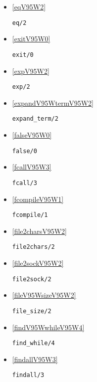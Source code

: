 \begin{itemize}
\item \ref{eqV95W2} 
\begin{verbatim}
eq/2
\end{verbatim}

\item \ref{exitV95W0} 
\begin{verbatim}
exit/0
\end{verbatim}

\item \ref{expV95W2} 
\begin{verbatim}
exp/2
\end{verbatim}

\item \ref{expandV95WtermV95W2} 
\begin{verbatim}
expand_term/2
\end{verbatim}

\item \ref{falseV95W0} 
\begin{verbatim}
false/0
\end{verbatim}

\item \ref{fcallV95W3} 
\begin{verbatim}
fcall/3
\end{verbatim}

\item \ref{fcompileV95W1} 
\begin{verbatim}
fcompile/1
\end{verbatim}

\item \ref{file2charsV95W2} 
\begin{verbatim}
file2chars/2
\end{verbatim}

\item \ref{file2sockV95W2} 
\begin{verbatim}
file2sock/2
\end{verbatim}

\item \ref{fileV95WsizeV95W2} 
\begin{verbatim}
file_size/2
\end{verbatim}

\item \ref{findV95WwhileV95W4} 
\begin{verbatim}
find_while/4
\end{verbatim}

\item \ref{findallV95W3} 
\begin{verbatim}
findall/3
\end{verbatim}


\end{itemize}
